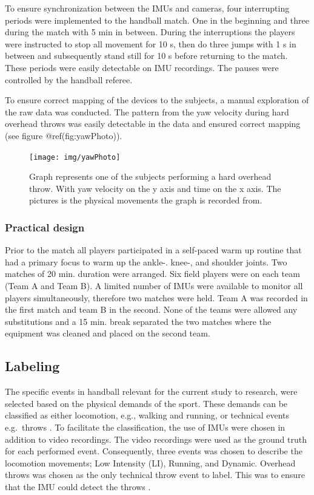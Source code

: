\documentclass[
]{article}
\begin{document}
To ensure synchronization between the IMUs and cameras, four
interrupting periods were implemented to the handball match. One in the
beginning and three during the match with 5 min in between. During the
interruptions the players were instructed to stop all movement for 10 s,
then do three jumps with 1 s in between and subsequently stand still for
10 s before returning to the match. These periods were easily detectable
on IMU recordings. The pauses were controlled by the handball referee.

To ensure correct mapping of the devices to the subjects, a manual
exploration of the raw data was conducted. The pattern from the yaw
velocity during hard overhead throws was easily detectable in the data
and ensured correct mapping (see figure @ref(fig:yawPhoto)).

\begin{figure}
\texttt{[image: img/yawPhoto]} \caption{Graph represents one of the subjects performing a hard overhead throw. With yaw velocity on the y axis and time on the x axis. The pictures is the physical movements the graph is recorded from. }\label{fig:yawPhoto}
\end{figure}

\hypertarget{practical-design}{%
\subsubsection{Practical design}\label{practical-design}}

Prior to the match all players participated in a self-paced warm up
routine that had a primary focus to warm up the ankle-. knee-, and
shoulder joints. Two matches of 20 min. duration were arranged. Six
field players were on each team (Team A and Team B). A limited number of
IMUs were available to monitor all players simultaneously, therefore two
matches were held. Team A was recorded in the first match and team B in
the second. None of the teams were allowed any substitutions and a 15
min. break separated the two matches where the equipment was cleaned and
placed on the second team.

\hypertarget{labeling}{%
\subsection{Labeling}\label{labeling}}

The specific events in handball relevant for the current study to
research, were selected based on the physical demands of the sport.
These demands can be classified as either locomotion, e.g., walking and
running, or technical events e.g.~throws \citep{Michalsik2018}. To
facilitate the classification, the use of IMUs were chosen in addition
to video recordings. The video recordings were used as the ground truth
for each performed event. Consequently, three events was chosen to
describe the locomotion movements; Low Intensity (LI), Running, and
Dynamic. Overhead throws was chosen as the only technical throw event to
label. This was to ensure that the IMU could detect the throws
\citep{Skejo2021}.
\end{document}
